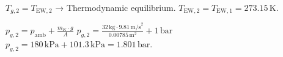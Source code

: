 \( T_{g,2} = T_{\text{EW},2} \) → Thermodynamic equilibrium.  
\( T_{\text{EW},2} = T_{\text{EW},1} = 273.15 \, \text{K} \).  

\( p_{g,2} = p_{\text{amb}} + \frac{m_K \cdot g}{A} \)  
\( p_{g,2} = \frac{32 \, \text{kg} \cdot 9.81 \, \text{m/s}^2}{0.00785 \, \text{m}^2} + 1 \, \text{bar} \)  
\( p_{g,2} = 180 \, \text{kPa} + 101.3 \, \text{kPa} = 1.801 \, \text{bar} \).